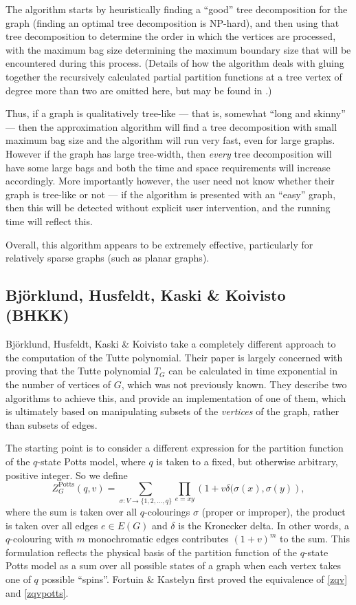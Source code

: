 The algorithm starts by heuristically finding a ``good'' tree decomposition for the graph (finding an optimal tree decomposition is NP-hard), and then using that tree decomposition to determine the order in which the vertices are processed, with the maximum bag size determining the maximum boundary size that will be encountered during this process. (Details of how the algorithm deals with gluing together the recursively calculated partial partition functions at a tree vertex of degree more than two are omitted here, but may be found in \cite{BJ10}.)

Thus, if a graph is qualitatively tree-like --- that is, somewhat ``long and skinny'' --- then the approximation algorithm will find a tree decomposition with small maximum bag size and the algorithm will run very fast, even for large graphs. However if the graph has large tree-width, then {\em every} tree decomposition will have some large bags and both the time and space requirements will increase accordingly. More importantly however, the user need not know whether their graph is tree-like or not --- if the algorithm is presented with an ``easy'' graph, then this will be detected without explicit user intervention, and the running time will reflect this.

Overall, this algorithm appears to be extremely effective, particularly for relatively sparse graphs (such as planar graphs). 

\subsection{Bj\"orklund, Husfeldt, Kaski \& Koivisto (BHKK)}

Bj\"orklund, Husfeldt, Kaski \& Koivisto take a completely different approach to the computation of the Tutte polynomial. Their paper is largely concerned with proving that the Tutte polynomial $T_G$ can be calculated in time exponential in the number of vertices of $G$, which was not previously known. They describe two algorithms to achieve this, and provide an implementation of one of them, which is ultimately based on manipulating subsets of the {\em vertices} of the graph, rather than subsets of edges.

The starting point is to consider a different expression for the partition function of the $q$-state Potts model, where $q$ is taken to 
a fixed, but otherwise arbitrary, positive integer. So we define
\begin{equation}\label{zqvpotts}
Z_G^{\mathrm{Potts}} (q,v) = \sum_{\sigma:V \rightarrow \{1,2,\ldots,q\}} \prod_{e = xy} \left( 1+v \delta(\sigma(x),\sigma(y) \right),
\end{equation}
where the sum is taken over all $q$-colourings $\sigma$ (proper or improper), the product is taken over all edges $e \in E(G)$ and $\delta$ is the Kronecker delta. In other words, a $q$-colouring with $m$ monochromatic edges contributes $(1+v)^m$ to the sum. This formulation reflects the physical basis of the partition function of the $q$-state Potts model as a sum over all possible states of a graph when each vertex takes one of $q$ possible ``spins''. Fortuin \& Kastelyn \cite{MR0359655} first proved the equivalence of \eqref{zqv} and \eqref{zqvpotts}.


